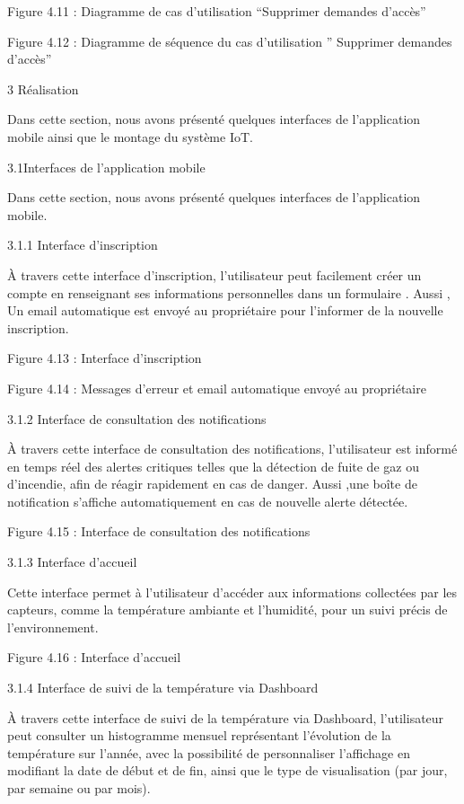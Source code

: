 \documentclass{article}
\begin{document}
Figure 4.11 : Diagramme de cas d’utilisation “Supprimer demandes d’accès”

Figure 4.12 : Diagramme de séquence du cas d’utilisation ” Supprimer demandes d’accès”

3 Réalisation 

Dans cette section, nous avons présenté quelques interfaces de l’application mobile ainsi que le montage du système IoT.

3.1Interfaces de l’application mobile

Dans cette section, nous avons présenté quelques interfaces de l’application mobile.

3.1.1 Interface d’inscription

À travers cette interface d’inscription, l’utilisateur peut facilement créer un compte en renseignant ses informations personnelles dans un formulaire . Aussi , Un email automatique est envoyé au propriétaire pour l’informer de la nouvelle inscription.

Figure 4.13 : Interface d’inscription

Figure 4.14 : Messages d’erreur et email automatique envoyé au propriétaire

3.1.2 Interface de consultation des notifications

À travers cette interface de consultation des notifications, l’utilisateur est informé en temps réel des alertes critiques telles que la détection de fuite de gaz ou d’incendie, afin de réagir rapidement en cas de danger. Aussi ,une boîte de notification s’affiche automatiquement en cas de nouvelle alerte détectée.

Figure 4.15 : Interface de consultation des notifications

3.1.3 Interface d’accueil

Cette interface permet à l’utilisateur d’accéder aux informations collectées par les capteurs, comme la température ambiante et l’humidité, pour un suivi précis de l’environnement.

Figure 4.16 : Interface d’accueil

3.1.4 Interface de suivi de la température via Dashboard

À travers cette interface de suivi de la température via Dashboard, l’utilisateur peut consulter un histogramme mensuel représentant l’évolution de la température sur l’année, avec la possibilité de personnaliser l’affichage en modifiant la date de début et de fin, ainsi que le type de visualisation (par jour, par semaine ou par mois). 
\end{document}
